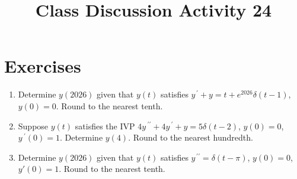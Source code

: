 \documentclass{ximera}
\begin{document}
\begin{abstract}
 \end{abstract}

    \title{Class Discussion Activity 24}
    
    \maketitle

\section*{Exercises}

\begin{enumerate}[label=(\arabic*)]


\item Determine $y(2026)$ given that $y(t)$ satisfies $y^{\,\prime}+y=t+e^{2026}\delta (t-1)$, $y(0)=0$.  Round to the nearest tenth.









\item Suppose $y(t)$ satisfies the IVP $4y\,^{\prime\prime}+4y\,^{\prime}+y=5\delta (t-2)$, $y(0)=0$, $y\,^{\prime}(0)=1$.  Determine $y(4)$.  Round to the nearest hundredth.








\item Determine $y(2026)$ given that $y(t)$ satisfies $y^{\,\prime\prime}=\delta (t-\pi)$, $y(0)=0$, $y'(0)=1$.  Round to the nearest tenth.






\end{enumerate}
\end{document}
